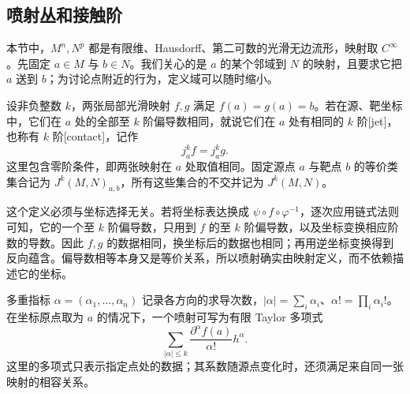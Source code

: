 \subsection{喷射丛和接触阶}
\label{g2:subsec:D03:01}

本节中，\(M^n,N^p\) 都是有限维、Hausdorff、第二可数的光滑无边流形，映射取 \(C^\infty\)。先固定 \(a\in M\) 与 \(b\in N\)。我们关心的是 \(a\) 的某个邻域到 \(N\) 的映射，且要求它把 \(a\) 送到 \(b\)；为讨论点附近的行为，定义域可以随时缩小。

\begin{definition}\label{g2:def:map-jet}
	设非负整数 \(k\)，两张局部光滑映射 \(f,g\) 满足 \(f(a)=g(a)=b\)。若在源、靶坐标中，它们在 \(a\) 处的全部至 \(k\) 阶偏导数相同，就说它们在 \(a\) 处有相同的 \(k\) 阶[jet]，也称有 \(k\) 阶[contact]，记作
	\[
		j_a^k f=j_a^k g.
	\]
	这里包含零阶条件，即两张映射在 \(a\) 处取值相同。固定源点 \(a\) 与靶点 \(b\) 的等价类集合记为 \(J^k(M,N)_{a,b}\)，所有这些集合的不交并记为 \(J^k(M,N)\)。
\end{definition}

这个定义必须与坐标选择无关。若将坐标表达换成 \(\psi\circ f\circ\varphi^{-1}\)，逐次应用链式法则可知，它的一个至 \(k\) 阶偏导数，只用到 \(f\) 的至 \(k\) 阶偏导数，以及坐标变换相应阶数的导数。因此 \(f,g\) 的数据相同，换坐标后的数据也相同；再用逆坐标变换得到反向蕴含。偏导数相等本身又是等价关系，所以喷射确实由映射定义，而不依赖描述它的坐标。

\ProseParagraphBreak

多重指标 \(\alpha=(\alpha_1,\ldots,\alpha_n)\) 记录各方向的求导次数，\(|\alpha|=\sum_i\alpha_i\)、\(\alpha!=\prod_i\alpha_i!\)。在坐标原点取为 \(a\) 的情况下，一个喷射可写为有限 Taylor 多项式
\[
	\sum_{|\alpha|\leq k}\frac{\partial^\alpha f(a)}{\alpha!}h^\alpha.
\]
这里的多项式只表示指定点处的数据；其系数随源点变化时，还须满足来自同一张映射的相容关系。

